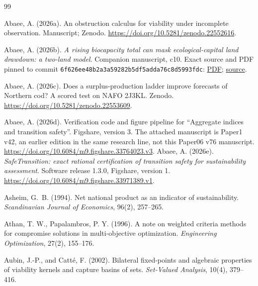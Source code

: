 \documentclass[preprint,11pt,authoryear]{elsarticle}
\theoremstyle{definition}
\theoremstyle{remark}
\begin{document}
\begin{thebibliography}{99}
\makeatletter\renewcommand{\@biblabel}[1]{}\makeatother

 Abaee, A. (2026a). An obstruction calculus for viability under incomplete observation. Manuscript; Zenodo. \url{https://doi.org/10.5281/zenodo.22552616}.

 Abaee, A. (2026b). \emph{A rising biocapacity total can mask ecological-capital land drawdown: a two-land model}. Companion manuscript, c10. Exact source and PDF pinned to commit \texttt{6f626ee48b2a3a59282b5df5adda76c8d5993fdc}: \href{https://github.com/MIKEAA2020/general-sustainability/blob/6f626ee48b2a3a59282b5df5adda76c8d5993fdc/agent%202%20productivity%20illusion/output_v45_ecomod_continued_10_gemini38_v4base_si_review_20261026/ecomod_continued_10.pdf}{PDF}; \href{https://github.com/MIKEAA2020/general-sustainability/blob/6f626ee48b2a3a59282b5df5adda76c8d5993fdc/agent%202%20productivity%20illusion/output_v45_ecomod_continued_10_gemini38_v4base_si_review_20261026/ecomod_continued_10.tex}{source}.

 Abaee, A. (2026c). Does a surplus-production ladder improve forecasts of Northern cod? A scored test on NAFO 2J3KL. Zenodo. \url{https://doi.org/10.5281/zenodo.22553609}.

 Abaee, A. (2026d). Verification code and figure pipeline for ``Aggregate indices and transition safety''. Figshare, version 3. The attached manuscript is Paper1 v42, an earlier edition in the same research line, not this Paper06 v76 manuscript. \url{https://doi.org/10.6084/m9.figshare.33764023.v3}.
 Abaee, A. (2026e). \emph{SafeTransition: exact rational certification of transition safety for sustainability assessment}. Software release 1.3.0, Figshare, version 1. \url{https://doi.org/10.6084/m9.figshare.33971389.v1}.

 Asheim, G.~B. (1994). Net national product as an indicator of sustainability. \emph{Scandinavian Journal of Economics}, 96(2), 257--265.

 Athan, T. W., Papalambros, P. Y. (1996). A note on weighted criteria methods for compromise solutions in multi-objective optimization. \emph{Engineering Optimization}, 27(2), 155--176.

 Aubin, J.-P., and Catt\'e, F. (2002). Bilateral fixed-points and algebraic properties of viability kernels and capture basins of sets. \emph{Set-Valued Analysis}, 10(4), 379--416.


\end{thebibliography}
\end{document}
